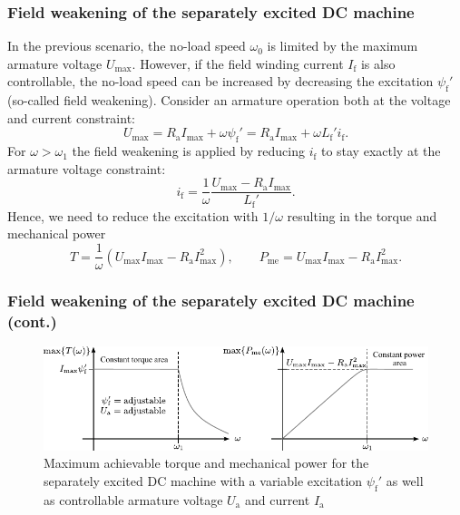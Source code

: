 \begin{frame}
	\frametitle{Field weakening of the separately excited DC machine}
			In the previous scenario, the no-load speed $\omega_0$ is limited by the maximum armature voltage $U_\mathrm{max}$. However, if the field winding current $I_\mathrm{f}$ is also controllable, the no-load speed can be increased by decreasing the excitation $\psi_\mathrm{f}'$ (so-called field weakening). \pause Consider an armature operation both at the voltage and current constraint:
			\begin{equation}
				U_\mathrm{max}  = R_\mathrm{a} I_\mathrm{max} + \omega \psi_\mathrm{f}'= R_\mathrm{a} I_\mathrm{max} + \omega L_\mathrm{f}' i_\mathrm{f}.
			\end{equation} \pause
			For $\omega > \omega_1$ the field weakening is applied by reducing $i_\mathrm{f}$ to stay exactly at the armature voltage constraint:
			\begin{equation}
				i_\mathrm{f} = \frac{1}{\omega}\frac{U_\mathrm{max} - R_\mathrm{a} I_\mathrm{max}}{L_\mathrm{f}'}.
			\end{equation} \pause
			Hence, we need to reduce the excitation with $1/\omega$ resulting in the torque and mechanical power
			\begin{equation}
				T = \frac{1}{\omega} \left(U_\mathrm{max}I_\mathrm{max} - R_\mathrm{a} I_\mathrm{max}^2\right), \qquad P_\mathrm{me} = U_\mathrm{max}I_\mathrm{max} - R_\mathrm{a} I_\mathrm{max}^2.
			\end{equation}
\end{frame}

\begin{frame}
	\frametitle{Field weakening of the separately excited DC machine (cont.)}
	\begin{figure}
		\centering
		\includegraphics[scale=1.1]{fig/lec03/Sep_DC_machine_field_weakening.pdf}
		\caption{Maximum achievable torque and mechanical power for the separately excited DC machine with a variable excitation $\psi_\mathrm{f}'$ as well as controllable armature voltage $U_\mathrm{a}$ and current $I_\mathrm{a}$}
		\label{fig:Sep_DC_machine_field_weakening}
\end{figure}
\end{frame}

